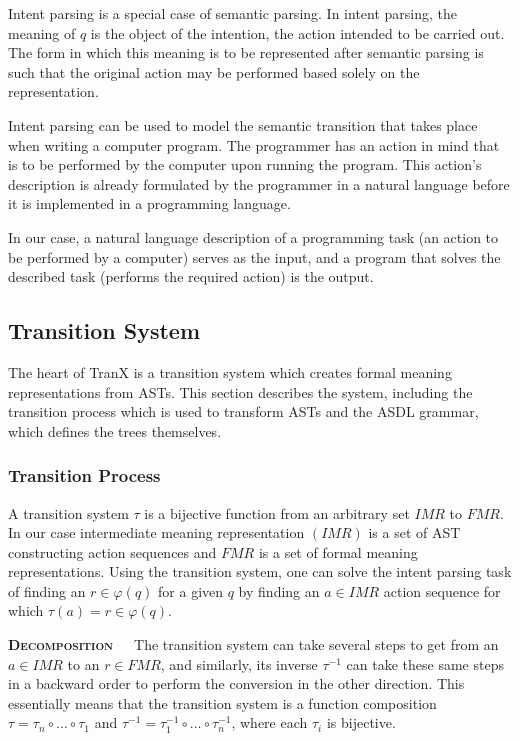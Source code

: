 Intent parsing is a special case of semantic parsing. In intent parsing,
the meaning of \(q\) is the object of the intention, the action intended
to be carried out. The form in which this meaning is to be represented
after semantic parsing is such that the original action may be performed
based solely on the representation.

Intent parsing can be used to model the semantic transition that takes
place when writing a computer program. The programmer has an action in
mind that is to be performed by the computer upon running the program.
This action's description is already formulated by the programmer in a
natural language before it is implemented in a programming language.

In our case, a natural language description of a programming task
(an action to be performed by a computer) serves as the input, and
a program that solves the described task (performs the required
action) is the output.

\subsection{Transition System}

The heart of TranX is a transition system which creates formal meaning
representations from ASTs. This section describes the system, including
the transition process which is used to transform ASTs and the ASDL
grammar, which defines the trees themselves.

\subsubsection{Transition Process}

A transition system \(\tau\) is a bijective function from an arbitrary set
\(IMR\) to \(FMR\). In our case intermediate meaning representation
\((IMR)\) is a set of AST constructing action sequences and \(FMR\)
is a set of formal meaning representations. Using the transition system,
one can solve the intent parsing task of finding an \(r \in \varphi(q)\)
for a given \(q\) by finding an \(a \in IMR\) action sequence for which
\(\tau(a) = r \in \varphi(q)\). 

\textbf{\textsc{Decomposition}}\ \ \ The transition system can take
several steps to get from an \(a \in IMR\) to an \(r \in FMR\), and
similarly, its inverse \(\tau^{-1}\) can take these same steps in a
backward order to perform the conversion in the other direction.
This essentially means that the transition system is a function composition
\(\tau = \tau_{n} \circ \dots \circ \tau_{1}\) and \(\tau^{-1} = 
\tau_{1}^{-1} \circ \dots \circ \tau_{n}^{-1}\), where each \(\tau_{i}\)
is bijective.

